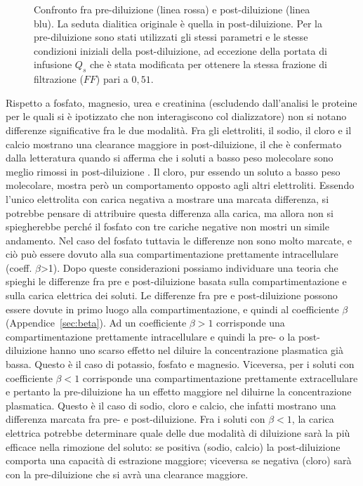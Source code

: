 \begin{figure}[tbh]
		\caption{Confronto fra pre-diluizione (linea rossa) e post-diluizione (linea blu). La seduta dialitica originale è quella in post-diluizione. Per la pre-diluizione sono stati utilizzati gli stessi parametri e le stesse condizioni iniziali della post-diluizione, ad eccezione della portata di infusione $Q_s$ che è stata modificata per ottenere la stessa frazione di filtrazione ($FF$) pari a $0,51$.}\label{fig:prevspost}
\end{figure}
Rispetto a fosfato, magnesio, urea e creatinina (escludendo dall'analisi le proteine per le quali si è ipotizzato che non interagiscono col dializzatore) non si notano differenze significative fra le due modalità. Fra gli elettroliti, il sodio, il cloro e il calcio mostrano una clearance maggiore in post-diluizione, il che è confermato dalla letteratura quando si afferma che i soluti a basso peso molecolare sono meglio rimossi in post-diluizione \cite{masakane}. Il cloro, pur essendo un soluto a basso peso molecolare, mostra però un comportamento opposto agli altri elettroliti. Essendo l'unico elettrolita con carica negativa a mostrare una marcata differenza, si potrebbe pensare di attribuire questa differenza alla carica, ma allora non si spiegherebbe perché il fosfato con tre cariche negative non mostri un simile andamento. Nel caso del fosfato tuttavia le differenze non sono molto marcate, e ciò può essere dovuto alla sua compartimentazione prettamente intracellulare (coeff. $\beta$>1). Dopo queste considerazioni possiamo individuare una teoria che spieghi le differenze fra pre e post-diluizione basata sulla compartimentazione e sulla carica elettrica dei soluti. Le differenze fra pre e post-diluizione possono essere dovute in primo luogo alla compartimentazione, e quindi al coefficiente $\beta$ (Appendice~\ref{sec:beta}). Ad un coefficiente $\beta>1$ corrisponde una compartimentazione prettamente intracellulare e quindi la pre- o la post-diluizione hanno uno scarso effetto nel diluire la concentrazione plasmatica già bassa. Questo è il caso di potassio, fosfato e magnesio. Viceversa, per i soluti con coefficiente $\beta<1$ corrisponde una compartimentazione prettamente extracellulare e pertanto la pre-diluizione ha un effetto maggiore nel diluirne la concentrazione plasmatica. Questo è il caso di sodio, cloro e calcio, che infatti mostrano una differenza marcata fra pre- e post-diluizione.
Fra i soluti con $\beta<1$, la carica elettrica potrebbe determinare quale delle due modalità di diluizione sarà la più efficace nella rimozione del soluto: se positiva (sodio, calcio) la post-diluizione comporta una capacità di estrazione maggiore; viceversa se negativa (cloro) sarà con la pre-diluizione che si avrà una clearance maggiore.

